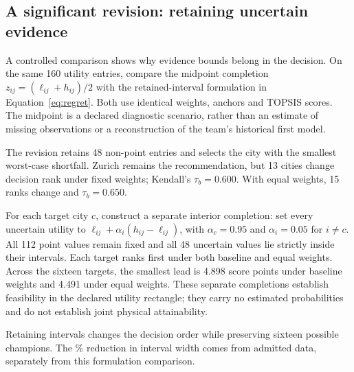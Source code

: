 \subsection{A significant revision: retaining uncertain evidence}
A controlled comparison shows why evidence bounds belong in the decision.
On the same 160 utility entries, compare the midpoint completion $z_{ij}=(\ell_{ij}+h_{ij})/2$ with the retained-interval formulation in Equation~\ref{eq:regret}. Both use identical weights, anchors and TOPSIS scores. The midpoint is a declared diagnostic scenario, rather than an estimate of missing observations or a reconstruction of the team's historical first model.

The revision retains 48 non-point entries and selects the city with the smallest worst-case shortfall. Zurich remains the recommendation, but 13 cities change decision rank under fixed weights; Kendall's $\tau_b=0.600$. With equal weights, 15 ranks change and $\tau_b=0.650$.

For each target city $c$, construct a separate interior completion: set every uncertain utility to $\ell_{ij}+\alpha_i(h_{ij}-\ell_{ij})$, with $\alpha_c=0.95$ and $\alpha_i=0.05$ for $i\ne c$. All 112 point values remain fixed and all 48 uncertain values lie strictly inside their intervals. Each target ranks first under both baseline and equal weights. Across the sixteen targets, the smallest lead is 4.898 score points under baseline weights and 4.491 under equal weights. These separate completions establish feasibility in the declared utility rectangle; they carry no estimated probabilities and do not establish joint physical attainability.

Retaining intervals changes the decision order while preserving sixteen possible champions. The \TotalWidthReduction\% reduction in interval width comes from admitted data, separately from this formulation comparison.
